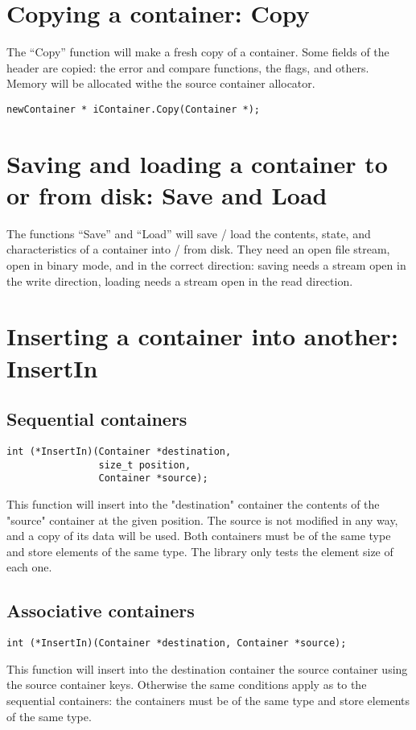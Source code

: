 \documentclass[12pt,a4paper]{memoir} %
\begin{document}
\section{Copying a container: Copy}
\noindent The “Copy” function will make a fresh copy of a container. Some fields of the header are copied: the error and compare functions, the flags, and others. Memory will be allocated withe the source container allocator.
\begin{verbatim}
newContainer * iContainer.Copy(Container *);
\end{verbatim}
\section{Saving and loading a container to or from disk: Save and Load}
The functions “Save” and “Load” will save / load the contents, state, and characteristics of a container into / from disk. They need an open file stream, open in binary mode, and in the correct direction: saving needs a stream open in the write direction, loading needs a stream open in the read direction.
\section{Inserting a container into another: InsertIn}
\subsection{Sequential containers}
\noindent
\begin{verbatim}
int (*InsertIn)(Container *destination,
                size_t position,
                Container *source);
\end{verbatim}
This function will insert into the "destination" container the contents of the "source" container at the given position. The source is not modified in any way, and a copy of its data will be used. Both containers must be of the same type and store elements of  the same type. The library only tests the element size of each one.
\subsection{Associative containers}
\begin{verbatim}
int (*InsertIn)(Container *destination, Container *source);
\end{verbatim}
This function will insert into the destination container the source container using the source container keys. Otherwise the same conditions apply as to the sequential containers: the containers must be of the same type and store elements of the same type.
\end{document}
